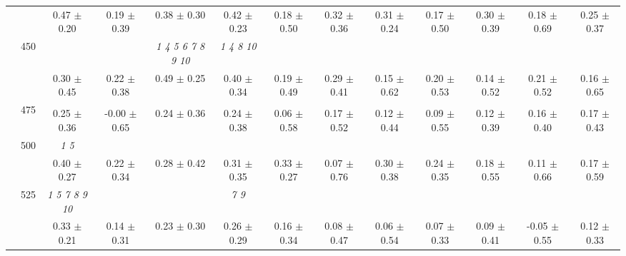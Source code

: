 \begin{table}[h]
{\begin{tabular}{
        ccccccccccccc}
 & & \cellcolor[HTML]{EFEFEF} 0.47 $\pm$ 0.20& \cellcolor[HTML]{EFEFEF} 0.19 $\pm$ 0.39& \cellcolor[HTML]{EFEFEF} 0.38 $\pm$ 0.30& \cellcolor[HTML]{EFEFEF} 0.42 $\pm$ 0.23& \cellcolor[HTML]{EFEFEF} 0.18 $\pm$ 0.50& \cellcolor[HTML]{EFEFEF} 0.32 $\pm$ 0.36& \cellcolor[HTML]{EFEFEF} 0.31 $\pm$ 0.24& \cellcolor[HTML]{EFEFEF} 0.17 $\pm$ 0.50& \cellcolor[HTML]{EFEFEF} 0.30 $\pm$ 0.39& \cellcolor[HTML]{EFEFEF} 0.18 $\pm$ 0.69& \cellcolor[HTML]{EFEFEF} 0.25 $\pm$ 0.37 \\ 
 & \multirow{2}{*}{450}& & & \textit{  1  4  5  6  7  8  9 10 }& \textit{  1  4  8 10 }& & & & & & &  \\ 
 & & 0.30 $\pm$ 0.45& 0.22 $\pm$ 0.38& 0.49 $\pm$ 0.25& 0.40 $\pm$ 0.34& 0.19 $\pm$ 0.49& 0.29 $\pm$ 0.41& 0.15 $\pm$ 0.62& 0.20 $\pm$ 0.53& 0.14 $\pm$ 0.52& 0.21 $\pm$ 0.52& 0.16 $\pm$ 0.65 \\ 
 & \multirow{2}{*}{475}& \cellcolor[HTML]{EFEFEF} & \cellcolor[HTML]{EFEFEF} & \cellcolor[HTML]{EFEFEF} & \cellcolor[HTML]{EFEFEF} & \cellcolor[HTML]{EFEFEF} & \cellcolor[HTML]{EFEFEF} & \cellcolor[HTML]{EFEFEF} & \cellcolor[HTML]{EFEFEF} & \cellcolor[HTML]{EFEFEF} & \cellcolor[HTML]{EFEFEF} & \cellcolor[HTML]{EFEFEF}  \\ 
 & & \cellcolor[HTML]{EFEFEF} 0.25 $\pm$ 0.36& \cellcolor[HTML]{EFEFEF} -0.00 $\pm$ 0.65& \cellcolor[HTML]{EFEFEF} 0.24 $\pm$ 0.36& \cellcolor[HTML]{EFEFEF} 0.24 $\pm$ 0.38& \cellcolor[HTML]{EFEFEF} 0.06 $\pm$ 0.58& \cellcolor[HTML]{EFEFEF} 0.17 $\pm$ 0.52& \cellcolor[HTML]{EFEFEF} 0.12 $\pm$ 0.44& \cellcolor[HTML]{EFEFEF} 0.09 $\pm$ 0.55& \cellcolor[HTML]{EFEFEF} 0.12 $\pm$ 0.39& \cellcolor[HTML]{EFEFEF} 0.16 $\pm$ 0.40& \cellcolor[HTML]{EFEFEF} 0.17 $\pm$ 0.43 \\ 
 & \multirow{2}{*}{500}& \textit{ 1 5 }& & & & & & & & & &  \\ 
 & & 0.40 $\pm$ 0.27& 0.22 $\pm$ 0.34& 0.28 $\pm$ 0.42& 0.31 $\pm$ 0.35& 0.33 $\pm$ 0.27& 0.07 $\pm$ 0.76& 0.30 $\pm$ 0.38& 0.24 $\pm$ 0.35& 0.18 $\pm$ 0.55& 0.11 $\pm$ 0.66& 0.17 $\pm$ 0.59 \\ 
 & \multirow{2}{*}{525}& \cellcolor[HTML]{EFEFEF} \textit{  1  5  7  8  9 10 }& \cellcolor[HTML]{EFEFEF} & \cellcolor[HTML]{EFEFEF} & \cellcolor[HTML]{EFEFEF} \textit{ 7 9 }& \cellcolor[HTML]{EFEFEF} & \cellcolor[HTML]{EFEFEF} & \cellcolor[HTML]{EFEFEF} & \cellcolor[HTML]{EFEFEF} & \cellcolor[HTML]{EFEFEF} & \cellcolor[HTML]{EFEFEF} & \cellcolor[HTML]{EFEFEF}  \\ 
 & & \cellcolor[HTML]{EFEFEF} 0.33 $\pm$ 0.21& \cellcolor[HTML]{EFEFEF} 0.14 $\pm$ 0.31& \cellcolor[HTML]{EFEFEF} 0.23 $\pm$ 0.30& \cellcolor[HTML]{EFEFEF} 0.26 $\pm$ 0.29& \cellcolor[HTML]{EFEFEF} 0.16 $\pm$ 0.34& \cellcolor[HTML]{EFEFEF} 0.08 $\pm$ 0.47& \cellcolor[HTML]{EFEFEF} 0.06 $\pm$ 0.54& \cellcolor[HTML]{EFEFEF} 0.07 $\pm$ 0.33& \cellcolor[HTML]{EFEFEF} 0.09 $\pm$ 0.41& \cellcolor[HTML]{EFEFEF} -0.05 $\pm$ 0.55& \cellcolor[HTML]{EFEFEF} 0.12 $\pm$ 0.33 \\ 

\end{tabular}}
\end{table}
